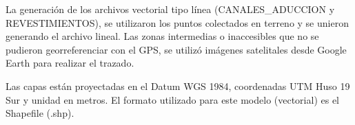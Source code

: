 \documentclass[]{article}
\begin{document}
La generación de los archivos vectorial tipo línea (CANALES\_ADUCCION y REVESTIMIENTOS), se utilizaron los puntos colectados en terreno y se unieron generando el archivo lineal. Las zonas intermedias o inaccesibles que no se pudieron georreferenciar con el GPS, se utilizó imágenes satelitales desde Google Earth para realizar el trazado.

Las capas están proyectadas en el Datum WGS 1984, coordenadas UTM Huso 19 Sur y unidad en metros. El formato utilizado para este modelo (vectorial) es el Shapefile (.shp). 
\end{document}
